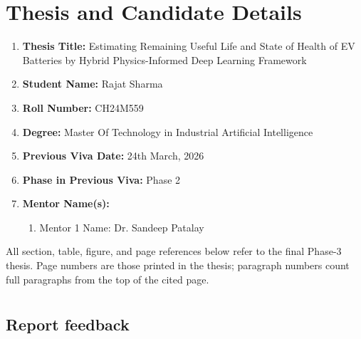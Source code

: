 \documentclass[12pt,a4paper]{article}
\begin{document}
\section*{}

\vspace{\baselineskip}

\section*{Thesis and Candidate Details}

\vspace{\baselineskip}

\begin{enumerate}
    \item \textbf{Thesis Title:} Estimating Remaining Useful Life and State of Health of EV Batteries by Hybrid Physics-Informed Deep Learning Framework
    \item \textbf{Student Name:} Rajat Sharma
    \item \textbf{Roll Number:} CH24M559
    \item \textbf{Degree:} Master Of Technology in Industrial Artificial Intelligence
    \item \textbf{Previous Viva Date:} 24th March, 2026
    \item \textbf{Phase in Previous Viva:} Phase 2
    \item \textbf{Mentor Name(s):}
            \begin{enumerate} [label=(\roman*)]
                \item Mentor 1 Name: Dr. Sandeep Patalay
            \end{enumerate}
\end{enumerate}

\vspace{\baselineskip}

\noindent All section, table, figure, and page references below refer to the final
Phase-3 thesis. Page numbers are those printed in the thesis; paragraph numbers
count full paragraphs from the top of the cited page.

\newpage

\section*{}

\subsection*{Report feedback}
\end{document}

